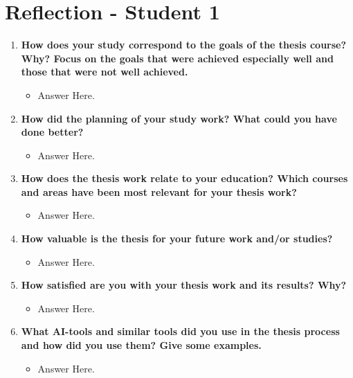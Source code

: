 \newpage
\chapter{Reflection - Student 1}

\begin{enumerate}
\item{\bf How does your study correspond to the goals of the thesis course? Why? Focus on the goals that were achieved especially well and those that were not well achieved.} 
\begin{itemize}
    \item Answer Here. 
\end{itemize}


\item{\bf How did the planning of your study work? What could you have done better?}

\begin{itemize}
    \item Answer Here. 
\end{itemize}

\item{\bf How does the thesis work relate to your education? Which courses and areas have been
most relevant for your thesis work?} 

\begin{itemize}
    \item Answer Here. 
\end{itemize}

\item{\bf How valuable is the thesis for your future work and/or studies?} 

\begin{itemize}
    \item Answer Here. 
\end{itemize}

\item{\bf How satisfied are you with your thesis work and its results? Why?} 

\begin{itemize}
    \item Answer Here. 
\end{itemize}

\item{\bf What AI-tools and similar tools did you use in the thesis process and how did you use them? Give some examples.} 

\begin{itemize}
    \item Answer Here. 
\end{itemize}

\end{enumerate}

